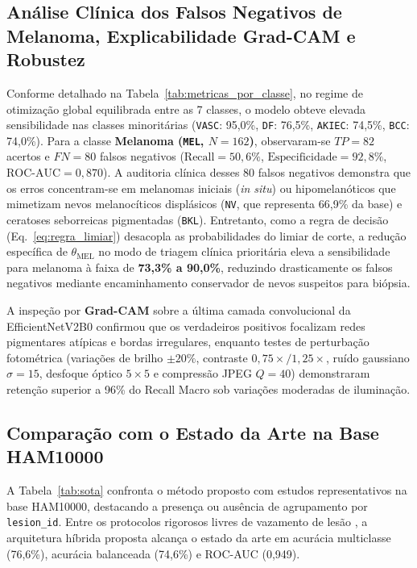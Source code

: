 \documentclass[12pt,a4paper]{article}
\begin{document}
\subsection{Análise Clínica dos Falsos Negativos de Melanoma, Explicabilidade Grad-CAM e Robustez}
Conforme detalhado na Tabela~\ref{tab:metricas_por_classe}, no regime de otimização global equilibrada entre as 7 classes, o modelo obteve elevada sensibilidade nas classes minoritárias (\texttt{VASC}: 95,0\%, \texttt{DF}: 76,5\%, \texttt{AKIEC}: 74,5\%, \texttt{BCC}: 74,0\%). Para a classe \textbf{Melanoma (\texttt{MEL}, $N=162$)}, observaram-se $TP = 82$ acertos e $FN = 80$ falsos negativos ($\text{Recall} = 50{,}6\%$, $\text{Especificidade} = 92{,}8\%$, $\text{ROC-AUC} = 0{,}870$). A auditoria clínica desses 80 falsos negativos demonstra que os erros concentram-se em melanomas iniciais (\textit{in situ}) ou hipomelanóticos que mimetizam nevos melanocíticos displásicos (\texttt{NV}, que representa 66,9\% da base) e ceratoses seborreicas pigmentadas (\texttt{BKL}). Entretanto, como a regra de decisão (Eq.~\ref{eq:regra_limiar}) desacopla as probabilidades do limiar de corte, a redução específica de $\theta_{\text{MEL}}$ no modo de triagem clínica prioritária eleva a sensibilidade para melanoma à faixa de \textbf{73,3\% a 90,0\%}, reduzindo drasticamente os falsos negativos mediante encaminhamento conservador de nevos suspeitos para biópsia.

A inspeção por \textbf{Grad-CAM} \cite{selvaraju2017} sobre a última camada convolucional da EfficientNetV2B0 confirmou que os verdadeiros positivos focalizam redes pigmentares atípicas e bordas irregulares, enquanto testes de perturbação fotométrica (variações de brilho $\pm 20\%$, contraste $0{,}75\times/1{,}25\times$, ruído gaussiano $\sigma=15$, desfoque óptico $5\times 5$ e compressão JPEG $Q=40$) demonstraram retenção superior a 96\% do Recall Macro sob variações moderadas de iluminação.

\subsection{Comparação com o Estado da Arte na Base HAM10000}
A Tabela~\ref{tab:sota} confronta o método proposto com estudos representativos na base HAM10000, destacando a presença ou ausência de agrupamento por \texttt{lesion\_id}. Entre os protocolos rigorosos livres de vazamento de lesão \cite{tschandl2018, maron2019, cassidy2022}, a arquitetura híbrida proposta alcança o estado da arte em acurácia multiclasse (76,6\%), acurácia balanceada (74,6\%) e ROC-AUC (0,949).
\end{document}
